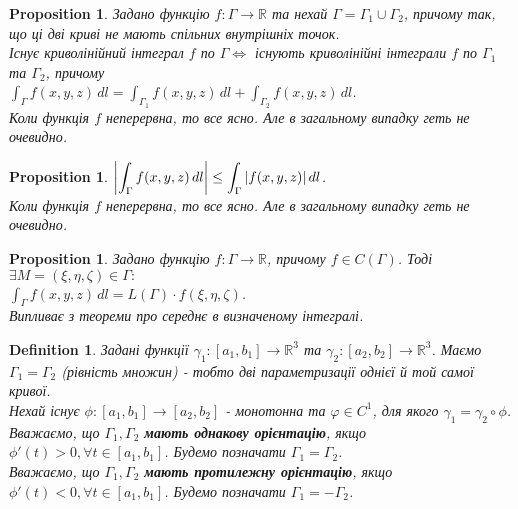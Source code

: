 \documentclass[a4paper, 10pt]{article}
\theoremstyle{theoremdd}
\theoremstyle{theoremdd}
\newtheorem{definition}[theorem]{Definition}
\theoremstyle{theoremdd}
\theoremstyle{theoremdd}
\theoremstyle{theoremdd}
\theoremstyle{theoremdd}
\theoremstyle{theoremdd}
\theoremstyle{theoremdd}
\theoremstyle{theoremdd}
\newtheorem{proposition}[theorem]{Proposition}
\theoremstyle{theoremdd}
\theoremstyle{theoremdd}
\theoremstyle{theoremdd}
\theoremstyle{theoremdd}
\theoremstyle{theoremdd}
\theoremstyle{theoremdd}
\begin{document}
\begin{proposition}
Задано функцію $f: \Gamma \to \mathbb{R}$ та нехай $\Gamma = \Gamma_1 \cup \Gamma_2$, причому так, що ці дві криві не мають спільних внутрішніх точок.\\
Існує криволінійний інтеграл $f$ по $\Gamma \iff$ існують криволінійні інтеграли $f$ по $\Gamma_1$ та $\Gamma_2$, причому\\
$\displaystyle\int_\Gamma f(x,y,z)\,dl = \int_{\Gamma_1} f(x,y,z)\,dl + \int_{\Gamma_2} f(x,y,z)\,dl$.\\
\textit{Коли функція $f$ неперервна, то все ясно. Але в загальному випадку геть не очевидно.}
\end{proposition}

\begin{proposition}
$\displaystyle \abs{\int_\Gamma f(x,y,z)\,dl} \leq \int_\Gamma |f(x,y,z)|\,dl$.\\
\textit{Коли функція $f$ неперервна, то все ясно. Але в загальному випадку геть не очевидно.}
\end{proposition}

\begin{proposition}
Задано функцію $f: \Gamma \to \mathbb{R}$, причому $f \in C(\Gamma)$. Тоді $\exists M = (\xi,\eta,\zeta) \in \Gamma:$\\
$\displaystyle\int_\Gamma f(x,y,z)\,dl = L(\Gamma) \cdot f(\xi,\eta,\zeta)$.\\
\textit{Випливає з теореми про середнє в визначеному інтегралі.}
\end{proposition}

\begin{definition}
Задані функції $\gamma_1: [a_1,b_1] \to \mathbb{R}^3$ та $\gamma_2: [a_2,b_2] \to \mathbb{R}^3$. Маємо $\Gamma_1 = \Gamma_2$ (рівність множин) - тобто дві параметризації однієї й той самої кривої.\\
Нехай існує $\phi: [a_1,b_1] \to [a_2,b_2]$ - монотонна та $\varphi \in C^1$, для якого $\gamma_1 = \gamma_2 \circ \phi$.\\
Вважаємо, що $\Gamma_1, \Gamma_2$ \textbf{мають однакову орієнтацію}, якщо $\phi'(t) > 0, \forall t \in [a_1,b_1]$. Будемо позначати $\Gamma_1 = \Gamma_2$.\\
Вважаємо, що $\Gamma_1, \Gamma_2$ \textbf{мають протилежну орієнтацію}, якщо $\phi'(t) < 0, \forall t \in [a_1,b_1]$. Будемо позначати $\Gamma_1 = -\Gamma_2$.
\end{definition}
\end{document}
